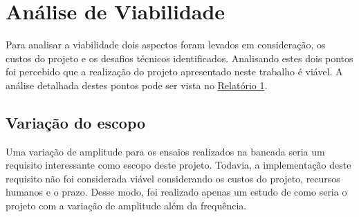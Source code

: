 \chapter{Análise de Viabilidade}

Para analisar a viabilidade dois aspectos foram levados em consideração, os custos do projeto e os desafios técnicos identificados. 
Analisando estes dois pontos foi percebido que a realização do projeto apresentado neste trabalho é viável. A análise detalhada destes pontos 
pode ser vista no \href{https://drive.google.com/file/d/0B5InkGKx6O-MR1B3eVYzZFpjQ3c/view?usp=sharing}{Relatório 1}. 

\section{Variação do escopo}
Uma variação de amplitude para os ensaios realizados na bancada seria um requisito interessante como escopo deste projeto. Todavia, a
implementação deste requisito não foi considerada viável considerando os custos do projeto, recursos humanos e o prazo. Desse modo, foi
realizado apenas um estudo de como seria o projeto com a variação de amplitude além da frequência. 








